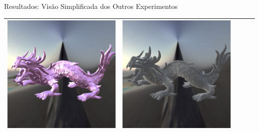 \begin{frame}[fragile]{Resultados: Visão Simplificada dos Outros Experimentos}
\begin{table}
\begin{tabular}{|c|c|c|c|c|}
           \includegraphics[scale=0.14]{./Imagens/brdfs/cook-torrance-alternative-dragon.png} &
           \includegraphics[scale=0.14]{./Imagens/brdfs/duer-dragon.png} \\ \hline
       \end{tabular}
   \end{table}


\end{frame}
